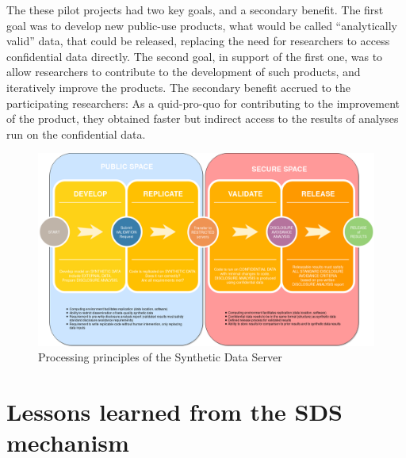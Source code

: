 \documentclass[]{hdsr}
\begin{document}
The these pilot projects had two key goals, and a secondary benefit. The first goal was to develop new public-use products, what would be called ``analytically valid'' data, that could be released, replacing the need for researchers to access confidential data directly. The second goal, in support of the first one, was to allow researchers to contribute to the development of such products, and iteratively improve the products. The secondary benefit accrued to the participating researchers: As a quid-pro-quo for contributing to the improvement of the product, they obtained faster but indirect access to the results of analyses run on the confidential data. 

\begin{figure}
    \centering
    \includegraphics[width=\textwidth]{figs/SyntheticDataCycle.png}
    \caption{Processing principles of the Synthetic Data Server}
    \label{fig:data-cycle.png}
\end{figure}


\restoregeometry
{}


\section{Lessons learned from the SDS mechanism}
\end{document}

